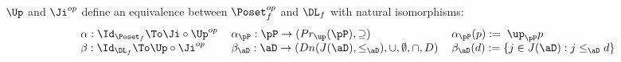 \documentclass{article}
\begin{document}

\begin{theorem}
\label{thm:birkhoff_duality}
\item
$\Up$ and $\Ji^{op}$ define an equivalence between $\Poset_f^{op}$ and $\DL_f$ with  natural isomorphisms:
\[
\begin{tabular}{lll}
$\alpha : \Id_{\Poset_f} \To \Ji \circ \Up^{op}$
&
$\alpha_\pP : \pP \to (Pr_\up(\pP),\supseteq)$
&
$\alpha_\pP (p) := \; \up_\pP p$
\\
$\beta : \Id_{\DL_f} \To \Up \circ \Ji^{op}$
&
$\beta_\aD : \aD \to (Dn(J(\aD),\leq_\aD),\cup,\emptyset,\cap,D)$
&
$\beta_\aD(d) := \{ j \in J(\aD) : j \leq_\aD d \}$
\end{tabular}
\]
\end{theorem}
\end{document}
